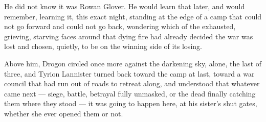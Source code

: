 He did not know it was Rowan Glover. He would learn that later, and would remember, learning it, this exact night, standing at the edge of a camp that could not go forward and could not go back, wondering which of the exhausted, grieving, starving faces around that dying fire had already decided the war was lost and chosen, quietly, to be on the winning side of its losing.

Above him, Drogon circled once more against the darkening sky, alone, the last of three, and Tyrion Lannister turned back toward the camp at last, toward a war council that had run out of roads to retreat along, and understood that whatever came next — siege, battle, betrayal fully unmasked, or the dead finally catching them where they stood — it was going to happen here, at his sister’s shut gates, whether she ever opened them or not.